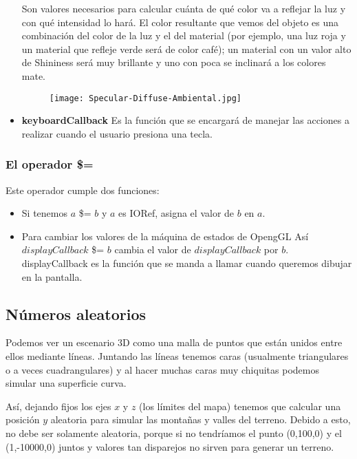 \documentclass{article}
\begin{document}
\begin{itemize}
Son valores necesarios para calcular cuánta de qué color va a reflejar la luz y con qué intensidad lo hará. El color resultante que vemos del objeto es una combinación del color de la luz y el del material (por ejemplo, una luz roja y un material que refleje verde será de color café); un material con un valor alto de Shininess será muy brillante y uno con poca se inclinará a los colores mate.

\begin{figure}[h!]
    \centering
    \texttt{[image: Specular-Diffuse-Ambiental.jpg]}

\end{figure}

\item \textbf{keyboardCallback}
Es la función que se encargará de manejar las acciones a realizar cuando el usuario presiona una tecla.
\end{itemize}

\newpage
\subsubsection{El operador \$=}

Este operador cumple dos funciones:
\begin{itemize}
    \item Si tenemos $a$ \$= $b$ y $a$ es IORef, asigna el valor de $b$ en $a$.
    \item Para cambiar los valores de la máquina de estados de OpengGL Así $displayCallback$ \$= $b$ cambia el valor de $displayCallback$ por $b$. displayCallback es la función que se manda a llamar cuando queremos dibujar en la pantalla.
    
\end{itemize}
\subsection{Números aleatorios}
Podemos ver un escenario 3D como una malla de puntos que están unidos entre ellos mediante líneas. Juntando las líneas tenemos caras (usualmente triangulares o a veces cuadrangulares) y al hacer muchas caras muy chiquitas podemos simular una superficie curva. 

Así, dejando fijos los ejes $x$ y $z$ (los límites del mapa) tenemos que calcular una posición $y$ aleatoria para simular las montañas y valles del terreno. Debido a esto, no debe ser solamente aleatoria, porque si no tendríamos el punto (0,100,0) y el (1,-10000,0) juntos y valores tan disparejos no sirven para generar un terreno.
\end{document}

